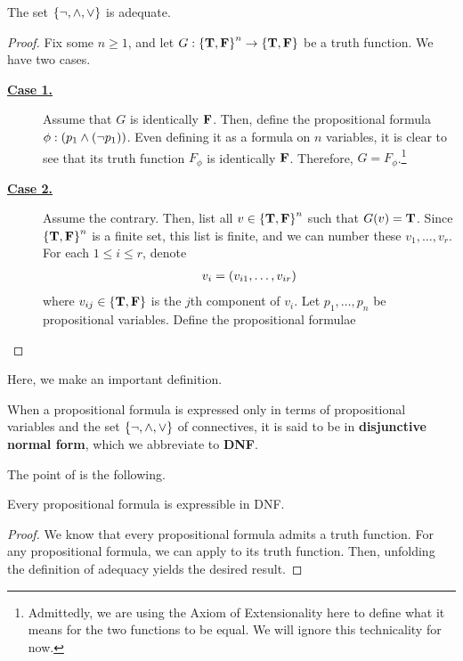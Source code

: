 \begin{boxtheorem}\label{Ch1:Thm:DNFConnectivesAdequate}
    The set $\left\{ \neg, \land, \lor \right\}$ is adequate.
\end{boxtheorem}
\begin{proof}
    Fix some $n \geq 1$, and let $G : \left\{ \mathbf{T}, \mathbf{F} \right\}^n \to \left\{ \mathbf{T}, \mathbf{F} \right\}$ be a truth function. We have two cases.

    \begin{description}
        \item[\textbf{\underline{Case 1.}}] Assume that $G$ is identically $\mathbf{F}$. Then, define the propositional formula $\phi : \left( p_1 \land \left( \neg p_1 \right) \right)$. Even defining it as a formula on $n$ variables, it is clear to see that its truth function $F_{\phi}$ is identically $\mathbf{F}$. Therefore, $G = F_{\phi}$.\footnote{Admittedly, we are using the Axiom of Extensionality here to define what it means for the two functions to be equal. We will ignore this technicality for now.}
        
        \item[\textbf{\underline{Case 2.}}] Assume the contrary. Then, list all $v \in \left\{ \mathbf{T}, \mathbf{F} \right\}^n$ such that $G(v) = \mathbf{T}$. Since $\left\{ \mathbf{T}, \mathbf{F} \right\}^n$ is a finite set, this list is finite, and we can number these $v_1, \ldots, v_r$. For each $1 \leq i \leq r$, denote
        \begin{align*}
            v_i = \left( v_{i1}, \ldots, v_{ir} \right)
        \end{align*}
        where $v_{ij} \in \left\{ \mathbf{T}, \mathbf{F} \right\}$ is the $j$th component of $v_i$. Let $p_1, \ldots, p_n$ be propositional variables. Define the propositional formulae \sorry %
    \end{description}
\end{proof}

Here, we make an important definition.

\begin{boxdefinition}
    When a propositional formula is expressed only in terms of propositional variables and the set $\left\{ \neg, \land, \lor \right\}$ of connectives, it is said to be in \textbf{disjunctive normal form}, which we abbreviate to \textbf{DNF}.
\end{boxdefinition}

The point of  is the following.

\begin{boxcorollary}
    Every propositional formula is expressible in DNF.
\end{boxcorollary}
\begin{proof}
    We know that every propositional formula admits a truth function. For any propositional formula, we can apply  to its truth function. Then, unfolding the definition of adequacy yields the desired result.
\end{proof}

